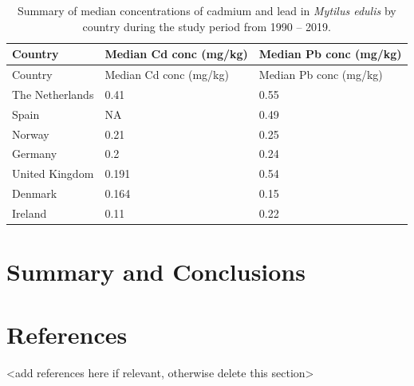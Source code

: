 \documentclass[
  12pt,
]{article}
\begin{document}
\begin{longtable}[]{@{}lll@{}}
\caption{Summary of median concentrations of cadmium and lead in
\emph{Mytilus edulis} by country during the study period from 1990 --
2019.}\tabularnewline
\toprule
Country & Median Cd conc (mg/kg) & Median Pb conc (mg/kg)\tabularnewline
\midrule
\endfirsthead
\toprule
Country & Median Cd conc (mg/kg) & Median Pb conc (mg/kg)\tabularnewline
\midrule
\endhead
The Netherlands & 0.41 & 0.55\tabularnewline
Spain & NA & 0.49\tabularnewline
Norway & 0.21 & 0.25\tabularnewline
Germany & 0.2 & 0.24\tabularnewline
United Kingdom & 0.191 & 0.54\tabularnewline
Denmark & 0.164 & 0.15\tabularnewline
Ireland & 0.11 & 0.22\tabularnewline
\bottomrule
\end{longtable}

\newpage

\hypertarget{summary-and-conclusions}{%
\section{Summary and Conclusions}\label{summary-and-conclusions}}

\newpage

\hypertarget{references}{%
\section{References}\label{references}}

\textless add references here if relevant, otherwise delete this
section\textgreater{}
\end{document}
